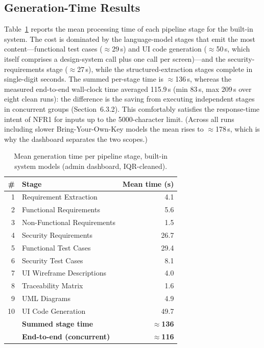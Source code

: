 \documentclass[12pt,a4paper,oneside]{report}
\begin{document}
\subsection{Generation-Time Results}
Table~\ref{tab:gentime} reports the mean processing time of each pipeline stage for the built-in system. The cost is dominated by the language-model stages that emit the most content---functional test cases ($\approx$29\,s) and UI code generation ($\approx$50\,s, which itself comprises a design-system call plus one call per screen)---and the security-requirements stage ($\approx$27\,s), while the structured-extraction stages complete in single-digit seconds. The summed per-stage time is $\approx$136\,s, whereas the measured end-to-end wall-clock time averaged 115.9\,s (min 83\,s, max 209\,s over eight clean runs): the difference is the saving from executing independent stages in concurrent groups (Section~6.3.2). This comfortably satisfies the response-time intent of NFR1 for inputs up to the 5000-character limit. (Across all runs including slower Bring-Your-Own-Key models the mean rises to $\approx$178\,s, which is why the dashboard separates the two scopes.)

\begin{table}[ht]
\centering
\caption{Mean generation time per pipeline stage, built-in system models (admin dashboard, IQR-cleaned).}
\label{tab:gentime}
\begin{tabular}{r l r}
\toprule
\textbf{\#} & \textbf{Stage} & \textbf{Mean time (s)} \\
\midrule
1 & Requirement Extraction & 4.1 \\
2 & Functional Requirements & 5.6 \\
3 & Non-Functional Requirements & 1.5 \\
4 & Security Requirements & 26.7 \\
5 & Functional Test Cases & 29.4 \\
6 & Security Test Cases & 8.1 \\
7 & UI Wireframe Descriptions & 4.0 \\
8 & Traceability Matrix & 1.6 \\
9 & UML Diagrams & 4.9 \\
10 & UI Code Generation & 49.7 \\
\midrule
 & \textbf{Summed stage time} & \textbf{$\approx$136} \\
 & \textbf{End-to-end (concurrent)} & \textbf{$\approx$116} \\
\bottomrule
\end{tabular}
\end{table}
\end{document}
